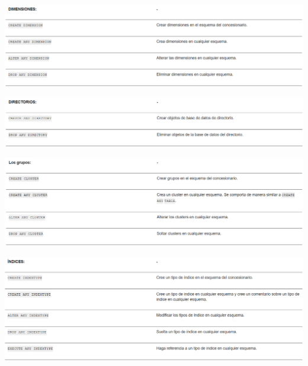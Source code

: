 \documentclass[12pt,letterpaper]{article}
\begin{document}
\begin{center}
  \includegraphics[width=14cm]{Imagenes/Privilegios_dimensiones.png}\\
\end{center}

\begin{center}
  \includegraphics[width=14cm]{Imagenes/Privilegios_directorios.png}\\
\end{center}

\begin{center}
  \includegraphics[width=14cm]{Imagenes/Privilegios_grupos.png}\\
\end{center}

\begin{center}
  \includegraphics[width=14cm]{Imagenes/Privilegios_indices.png}\\
\end{center}
\end{document}
